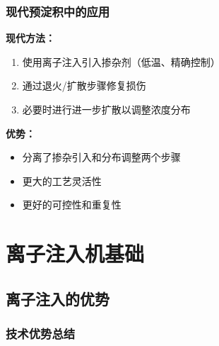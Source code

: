 \documentclass[UTF8,12pt,a4paper]{ctexart}
\begin{document}
\subsubsection{现代预淀积中的应用}

\textbf{现代方法：}

\begin{enumerate}
    \item 使用离子注入引入掺杂剂（低温、精确控制）
    \item 通过退火/扩散步骤修复损伤
    \item 必要时进行进一步扩散以调整浓度分布
\end{enumerate}

\textbf{优势：}
\begin{itemize}
    \item 分离了掺杂引入和分布调整两个步骤
    \item 更大的工艺灵活性
    \item 更好的可控性和重复性
\end{itemize}

\newpage

\section{离子注入机基础}

\subsection{离子注入的优势}

\subsubsection{技术优势总结}
\end{document}
